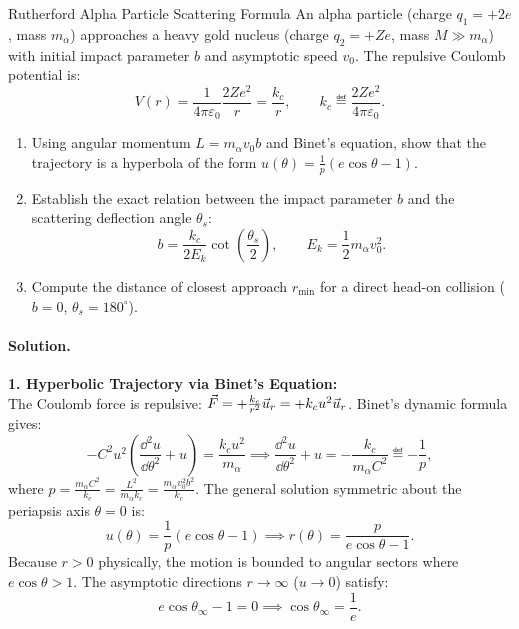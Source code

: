 \begin{workedexample}{Rutherford Alpha Particle Scattering Formula}
An alpha particle (charge $q_1 = +2e$, mass $m_\alpha$) approaches a heavy gold nucleus (charge $q_2 = +Ze$, mass $M \gg m_\alpha$) with initial impact parameter $b$ and asymptotic speed $v_0$. The repulsive Coulomb potential is:
\begin{equation}
V(r) = \frac{1}{4\pi\varepsilon_0}\frac{2Ze^2}{r} = \frac{k_c}{r}, \qquad k_c \eqdef \frac{2Ze^2}{4\pi\varepsilon_0}.
\end{equation}
\begin{enumerate}[leftmargin=1.4em,itemsep=3pt]
  \item Using angular momentum $L = m_\alpha v_0 b$ and Binet's equation, show that the trajectory is a hyperbola of the form $u(\theta) = \frac{1}{p}(e\cos\theta - 1)$.
  \item Establish the exact relation between the impact parameter $b$ and the scattering deflection angle $\theta_s$:
  \begin{equation}
  b = \frac{k_c}{2 E_k} \cot\left(\frac{\theta_s}{2}\right), \qquad E_k = \frac{1}{2}m_\alpha v_0^2.
  \end{equation}
  \item Compute the distance of closest approach $r_{\min}$ for a direct head-on collision ($b = 0$, $\theta_s = 180^\circ$).
\end{enumerate}

\paragraph{Solution.}
\textbf{1. Hyperbolic Trajectory via Binet's Equation:}\\
The Coulomb force is repulsive: $\vec{F} = +\frac{k_c}{r^2}\vec{u}_r = +k_c u^2\vec{u}_r$. Binet's dynamic formula gives:
\[
-C^2 u^2\left(\frac{\dd^2 u}{\dd\theta^2} + u\right) = \frac{k_c u^2}{m_\alpha} \implies \frac{\dd^2 u}{\dd\theta^2} + u = -\frac{k_c}{m_\alpha C^2} \eqdef -\frac{1}{p},
\]
where $p = \frac{m_\alpha C^2}{k_c} = \frac{L^2}{m_\alpha k_c} = \frac{m_\alpha v_0^2 b^2}{k_c}$.
The general solution symmetric about the periapsis axis $\theta = 0$ is:
\[
u(\theta) = \frac{1}{p}(e\cos\theta - 1) \implies r(\theta) = \frac{p}{e\cos\theta - 1}.
\]
Because $r > 0$ physically, the motion is bounded to angular sectors where $e\cos\theta > 1$. The asymptotic directions $r \to \infty$ ($u \to 0$) satisfy:
\[
e\cos\theta_\infty - 1 = 0 \implies \cos\theta_\infty = \frac{1}{e}.
\]


\end{workedexample}
